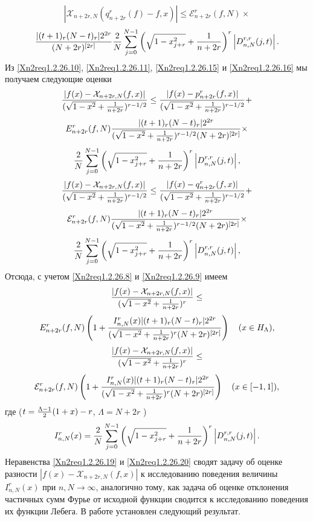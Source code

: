 $$|\mathcal{X}_{n+2r,N}(q_{n+2r}^r(f)-f,x)|\le \mathcal{E}_{n+2r}^r(f,N)\times
$$
\begin{equation}\label{Xn2req1.2.26.16}
{|(t+1)_r(N-t)_r|2^{2r}\over (N+2r)^{[2r]}}{2\over N}
\sum_{j=0}^{N-1}\left(\sqrt{1-x_{j+r}^2}+{1\over
n+2r}\right)^r\left|D_{n,N}^{r,r}(j,t)\right|.
\end{equation}
Из \eqref{Xn2req1.2.26.10}, \eqref{Xn2req1.2.26.11}, \eqref{Xn2req1.2.26.15} и \eqref{Xn2req1.2.26.16} мы получаем следующие оценки
$$
{|f(x)-\mathcal{X}_{n+2r,N}(f,x)|\over(\sqrt{1-x^2}+{1\over
n+2r})^{r-1/2}}\le {|f(x)-p_{n+2r}^r(f,x)|\over(\sqrt{1-x^2}+{1\over
n+2r})^{r-1/2}}+
$$
$$
E_{n+2r}^r(f,N)
{|(t+1)_r(N-t)_r|2^{2r}\over(\sqrt{1-x^2}+{1\over n+2r})^{r-1/2}
(N+2r)^{[2r]}}\times
$$
$$
{2\over N}\sum_{j=0}^{N-1}\left(\sqrt{1-x_{j+r}^2}+{1\over
n+2r}\right)^r\left|D_{n,N}^{r,r}(j,t)\right|,
$$
 $$
 {|f(x)-\mathcal{X}_{n+2r,N}(f,x)|\over(\sqrt{1-x^2}+{1\over n+2r})^{r-1/2}}\le
{|f(x)-q_{n+2r}^r(f,x)|\over(\sqrt{1-x^2}+{1\over n+2r})^{r-1/2}}+
$$
$$\mathcal{E}_{n+2r}^r(f,N)
{|(t+1)_r(N-t)_r|2^{2r}\over(\sqrt{1-x^2}+{1\over n+2r})^{r-1/2}
(N+2r)^{[2r]}}\times
$$
\begin{equation}\label{Xn2req1.2.26.18}
{2\over N}
\sum_{j=0}^{N-1}\left(\sqrt{1-x_{j+r}^2}+{1\over
n+2r}\right)^r\left|D_{n,N}^{r,r}(j,t)\right|,
\end{equation}
Отсюда, с учетом \eqref{Xn2req1.2.26.8} и \eqref{Xn2req1.2.26.9} имеем
$$
{|f(x)-\mathcal{X}_{n+2r,N}(f,x)|\over(\sqrt{1-x^2}+{1\over n+2r})^{r}}\le
$$
\begin{equation}\label{Xn2req1.2.26.19}
E_{n+2r}^r(f,N)\left(1
+{I_{n,N}^r(x)|(t+1)_r(N-t)_r|2^{2r}\over(\sqrt{1-x^2}+{1\over
n+2r})^r (N+2r)^{[2r]}}\right)\quad (x\in H_\Lambda),
\end{equation}
$$
{|f(x)-\mathcal{X}_{n+2r,N}(f,x)|\over(\sqrt{1-x^2}+{1\over
n+2r})^{r}}\le
 $$
\begin{equation}\label{Xn2req1.2.26.20}
\mathcal{E}_{n+2r}^r(f,N)\left(1
+{I_{n,N}^r(x)|(t+1)_r(N-t)_r|2^{2r}\over(\sqrt{1-x^2}+{1\over
n+2r})^r (N+2r)^{[2r]}}\right) \quad (x\in [-1,1]),
\end{equation}
 где ($t={\Lambda-1\over2}(1+x)-r$, $\Lambda=N+2r$ )
 \begin{equation}\label{Xn2req1.2.26.21}
 I_{n,N}^r(x)=
{2\over N} \sum_{j=0}^{N-1}\left(\sqrt{1-x_{j+r}^2}+{1\over
n+2r}\right)^r\left|D_{n,N}^{r,r}(j,t)\right|.
\end{equation}
Неравенства \eqref{Xn2req1.2.26.19} и \eqref{Xn2req1.2.26.20} сводят задачу об оценке разности
$|f(x)-\mathcal{X}_{n+2r,N}(f,x)|$ к исследованию поведения величины
$I_{n,N}^r(x)$ при $n,N\to \infty$, аналогично тому,  как задача об
оценке отклонения частичных сумм Фурье от исходной функции сводится
к исследованию  поведения их функции Лебега. В работе \cite{idprm99} установлен  следующий результат.

